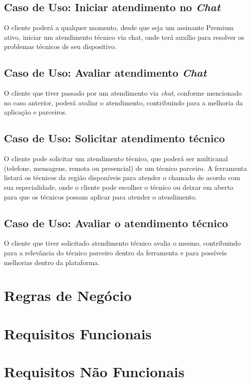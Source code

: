 \subsection{Caso de Uso: Iniciar atendimento no \textit{Chat}}
O cliente poderá a qualquer momento, desde que seja um assinante Premium ativo, iniciar um atendimento técnico via chat, onde terá auxílio para resolver os problemas técnicos de seu dispositivo.

\subsection{Caso de Uso: Avaliar atendimento \textit{Chat}}
O cliente que tiver passado por um atendimento via \textit{chat}, conforme mencionado no caso anterior, poderá avaliar o atendimento, contribuindo para a melhoria da aplicação e parceiros.

\subsection{Caso de Uso: Solicitar atendimento técnico}
O cliente pode solicitar um atendimento técnico, que poderá ser multicanal (telefone, mensagens, remota ou presencial) de um técnico parceiro. A ferramenta listará os técnicos da região disponíveis para atender o chamado de acordo com sua especialidade, onde o cliente pode escolher o técnico ou deixar em aberto para que os técnicos possam aplicar para atender o atendimento.

\subsection{Caso de Uso: Avaliar o atendimento técnico}
O cliente que tiver solicitado atendimento técnico avalia o mesmo, contribuindo para a relevância do técnico parceiro dentro da ferramenta e para possíveis melhorias dentro da plataforma.
\section{Regras de Negócio}

\section{Requisitos Funcionais}

\section{Requisitos Não Funcionais}

